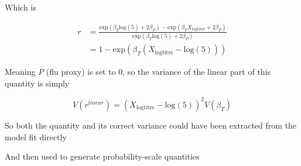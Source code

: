 \documentclass[]{article}
\newenvironment{Shaded}{\begin{snugshade}}{\end{snugshade}}
\newcommand{\DecValTok}[1]{\textcolor[rgb]{0.00,0.00,0.81}{#1}}
\newcommand{\FloatTok}[1]{\textcolor[rgb]{0.00,0.00,0.81}{#1}}
\newcommand{\KeywordTok}[1]{\textcolor[rgb]{0.13,0.29,0.53}{\textbf{#1}}}
\newcommand{\NormalTok}[1]{#1}
\newcommand{\OperatorTok}[1]{\textcolor[rgb]{0.81,0.36,0.00}{\textbf{#1}}}
\newcommand{\StringTok}[1]{\textcolor[rgb]{0.31,0.60,0.02}{#1}}
\begin{document}
Which is

\[
\begin{aligned}
r &= \frac{\text{exp}(\beta_T\text{log}(5)+2\beta_P)-\text{exp}(\beta_TX_\text{logtitre}+2\beta_P)}{\text{exp}(\beta_T\text{log}(5)+2\beta_P)} \\
&=
1 - \text{exp}(\beta_T(X_\text{logtitre}-\text{log}(5)))
\end{aligned}
\]

Meaning \(P\) (flu proxy) is set to 0, so the variance of the linear part of this quantity is simply

\[
V(r^{linear})=(X_\text{logtitre}-\text{log}(5))^2V(\beta_T)
\]

So both the quantity and its correct variance could have been extracted from the model fit directly

\begin{Shaded}
\end{Shaded}

And then used to generate probability-scale quantities

\begin{Shaded}
\end{Shaded}
\end{document}
